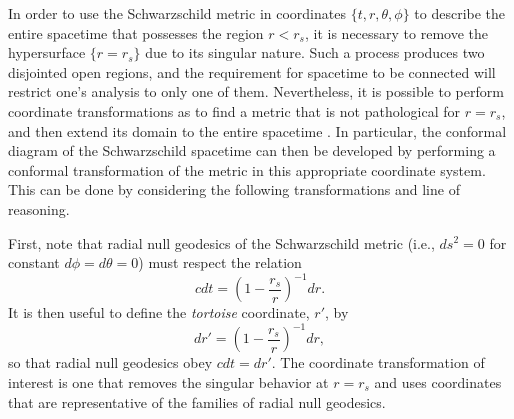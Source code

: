 \documentclass[
12pt,		%
openright,	%
twoside,  %
a4paper,			%
chapter=TITLE,		%
english,			%
french,				%
spanish,			%
brazil				%
]{USPSC-classe/USPSC}
\begin{document}
In order to use the Schwarzschild metric in coordinates $\{t,r,\theta,\phi\}$ to describe the entire spacetime that possesses the region $r<r_s$, it is necessary to remove the hypersurface $\{r=r_s\}$ due to its singular nature. Such a process produces two disjointed open regions, and the requirement for spacetime to be connected will restrict one's analysis to only one of them. Nevertheless, it is possible to perform coordinate transformations as to find a metric that is not pathological for $r=r_s$, and then extend its domain to the entire spacetime \cite{Hawking1973}. In particular, the conformal diagram of the Schwarzschild spacetime can then be developed by performing a conformal transformation of the metric in this appropriate coordinate system. This can be done by considering the following transformations and line of reasoning.

First, note that radial null geodesics of the Schwarzschild metric (i.e., $ds^2=0$ for constant $d\phi=d\theta=0$) must respect the relation
\begin{equation}\label{eq33}
    cdt=\left(1-\frac{r_s}{r}\right)^{-1}dr.
\end{equation}
It is then useful to define the \textit{tortoise} coordinate, $r'$, by
\begin{equation}
    dr'=\left(1-\frac{r_s}{r}\right)^{-1}dr,
\end{equation}
so that radial null geodesics obey $cdt=dr'$. The coordinate transformation of interest is one that removes the singular behavior at $r=r_s$ and uses coordinates that are representative of the families of radial null geodesics.
\end{document}
